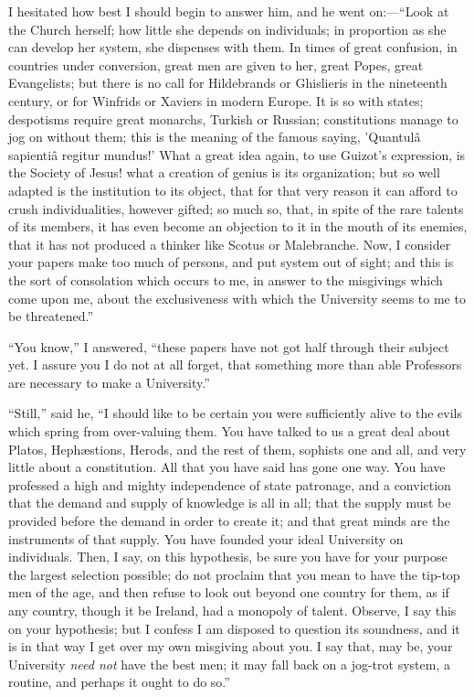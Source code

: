 I hesitated how best I should begin to answer him, and he went on:—``Look
at the Church herself; how little she depends on individuals; in
proportion as she can develop her system, she dispenses with them. In
times of great confusion, in countries under conversion, great men are
given to her, great Popes, great Evangelists; but there is no call for
Hildebrands or Ghislieris in the nineteenth century, or for Winfrids
or Xaviers in modern Europe. It is so with states; despotisms require
great monarchs, Turkish or Russian; constitutions manage to jog on
without them; this is the meaning of the famous saying, 'Quantulâ
sapientiâ regitur mundus!' What a great idea again, to use Guizot's
expression, is the Society of Jesus! what a creation of genius is
its organization; but so well adapted is the institution to its
object, that for that very reason it can afford to crush
individualities, however gifted; so much so, that, in spite of the
rare talents of its members, it has even become an objection to it in
the mouth of its enemies, that it has not produced a thinker like
Scotus or Malebranche. Now, I consider your papers make too much of
persons, and put system out of sight; and this is the sort of
consolation which occurs to me, in answer to the misgivings which come
upon me, about the exclusiveness with which the University seems to me
to be threatened.''

``You know,'' I answered, ``these papers have not got
half through their subject yet. I assure you I do not at all forget,
that something more than able Professors are necessary to make a
University.''

``Still,'' said he, ``I should like to be certain you
were sufficiently alive to the evils which spring from over-valuing
them. You have talked to us a great deal about Platos, Hephæstions,
Herods, and the rest of them, sophists one and all, and very little
about a constitution. All that you have said has gone one way. You
have professed a high and mighty independence of state patronage, and
a conviction that the demand and supply of knowledge is all in all;
that the supply must be provided before the demand in order to create
it; and that great minds are the instruments of that supply. You have
founded your ideal University on individuals. Then, I say, on this
hypothesis, be sure you have for your purpose the largest selection
possible; do not proclaim that you mean to have the tip-top men of the
age, and then refuse to look out beyond one country for them, as if
any country, though it be Ireland, had a monopoly of talent.
Observe, I say this on your hypothesis; but I confess I am disposed to
question its soundness, and it is in that way I get over my own
misgiving about you. I say that, may be, your University \emph{need not}
have the best men; it may fall back on a jog-trot system, a routine,
and perhaps it ought to do so.''

